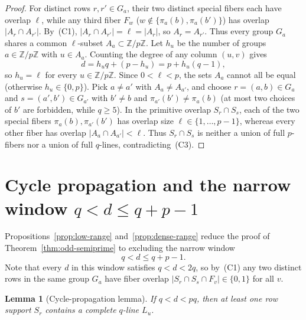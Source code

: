 \documentclass[11pt,reqno]{amsart}
\numberwithin{equation}{section}
\newtheorem{lemma}[theorem]{Lemma}
\theoremstyle{definition}
\theoremstyle{remark}
\newcommand{\Z}{\mathbb{Z}}
\begin{document}
\begin{proof}
For distinct rows $r,r'\in G_a$, their two distinct special fibers each have overlap $\ell$, while any third fiber $F_w$ ($w\notin\{\pi_a(b),\pi_a(b')\}$) has overlap $|A_r\cap A_{r'}|$. By~(C1), $|A_r\cap A_{r'}|=\ell=|A_r|$, so $A_r=A_{r'}$. Thus every group $G_a$ shares a common $\ell$-subset $A_a\subset\Z/p\Z$. Let $h_u$ be the number of groups $a\in\Z/p\Z$ with $u\in A_a$. Counting the degree of any column $(u,v)$ gives
\[
d = h_u q + (p - h_u) = p + h_u(q-1),
\]
so $h_u=\ell$ for every $u\in\Z/p\Z$. Since $0<\ell<p$, the sets $A_a$ cannot all be equal (otherwise $h_u\in\{0,p\}$). Pick $a\neq a'$ with $A_a\neq A_{a'}$, and choose $r=(a,b)\in G_a$ and $s=(a',b')\in G_{a'}$ with $b'\neq b$ and $\pi_{a'}(b')\neq \pi_a(b)$ (at most two choices of $b'$ are forbidden, while $q\ge 5$). In the primitive overlap $S_r\cap S_s$, each of the two special fibers $\pi_a(b),\pi_{a'}(b')$ has overlap size $\ell\in\{1,\ldots,p-1\}$, whereas every other fiber has overlap $|A_a\cap A_{a'}|<\ell$. Thus $S_r\cap S_s$ is neither a union of full $p$-fibers nor a union of full $q$-lines, contradicting~(C3).
\end{proof}

\section{Cycle propagation and the narrow window $q<d\le q+p-1$}
\label{sec:window}

Propositions~\ref{prop:low-range} and~\ref{prop:dense-range} reduce the proof of Theorem~\ref{thm:odd-semiprime} to excluding the narrow window
\[
q < d \le q + p - 1.
\]
Note that every $d$ in this window satisfies $q<d<2q$, so by~(C1) any two distinct rows in the same group $G_a$ have fiber overlap $|S_r\cap S_s\cap F_v|\in\{0,1\}$ for all $v$.

\begin{lemma}[Cycle-propagation lemma]
\label{lem:cycle-prop}
If $q<d<pq$, then at least one row support $S_r$ contains a complete $q$-line $L_u$.
\end{lemma}
\end{document}
